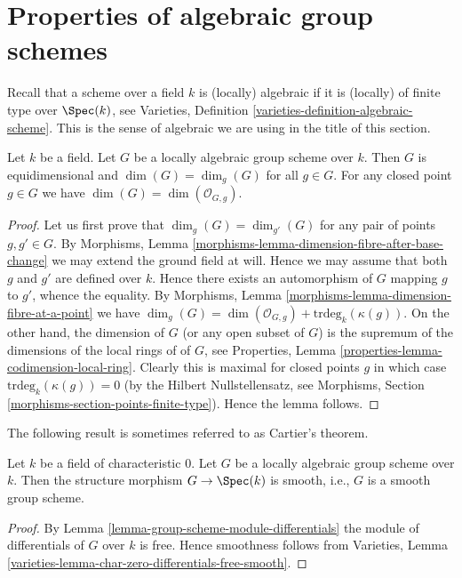 \section{Properties of algebraic group schemes}
\label{section-algebraic-group-schemes}

\noindent
Recall that a scheme over a field $k$ is (locally) algebraic if it is
(locally) of finite type over $\Spec(k)$, see
Varieties, Definition \ref{varieties-definition-algebraic-scheme}.
This is the sense of algebraic we are using in the title of this section.

\begin{lemma}
\label{lemma-group-scheme-finite-type-field}
Let $k$ be a field. Let $G$ be a locally algebraic group scheme over $k$.
Then $G$ is equidimensional and $\dim(G) = \dim_g(G)$ for all $g \in G$.
For any closed point $g \in G$ we have $\dim(G) = \dim(\mathcal{O}_{G, g})$.
\end{lemma}

\begin{proof}
Let us first prove that $\dim_g(G) = \dim_{g'}(G)$ for any
pair of points $g, g' \in G$. By
Morphisms, Lemma \ref{morphisms-lemma-dimension-fibre-after-base-change}
we may extend the ground field at will. Hence we may assume that
both $g$ and $g'$ are defined over $k$. Hence there exists an
automorphism of $G$ mapping $g$ to $g'$, whence the equality.
By
Morphisms, Lemma \ref{morphisms-lemma-dimension-fibre-at-a-point}
we have
$\dim_g(G) = \dim(\mathcal{O}_{G, g}) +
\text{trdeg}_k(\kappa(g))$.
On the other hand, the dimension of $G$ (or any open subset of $G$)
is the supremum of the dimensions of the local rings of of $G$, see
Properties, Lemma \ref{properties-lemma-codimension-local-ring}.
Clearly this is maximal for closed points $g$ in which case
$\text{trdeg}_k(\kappa(g)) = 0$ (by the Hilbert Nullstellensatz, see
Morphisms, Section \ref{morphisms-section-points-finite-type}).
Hence the lemma follows.
\end{proof}

\noindent
The following result is sometimes referred to as Cartier's theorem.

\begin{lemma}
\label{lemma-group-scheme-characteristic-zero-smooth}
Let $k$ be a field of characteristic $0$. Let $G$ be a
locally algebraic group scheme over $k$. Then the structure
morphism $G \to \Spec(k)$ is smooth, i.e., $G$ is a smooth
group scheme.
\end{lemma}

\begin{proof}
By
Lemma \ref{lemma-group-scheme-module-differentials}
the module of differentials of $G$ over $k$ is free.
Hence smoothness follows from
Varieties, Lemma \ref{varieties-lemma-char-zero-differentials-free-smooth}.
\end{proof}

